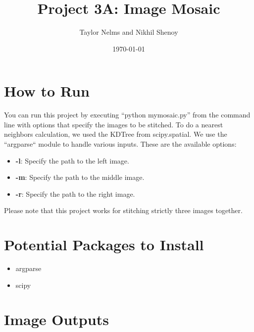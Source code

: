 \documentclass[10pt]{article}
\begin{document}
\title{\vspace{-2.0cm}Project 3A: Image Mosaic}
\author{Taylor Nelms and Nikhil Shenoy}
\date{\today}

\maketitle

\section{How to Run}
	You can run this project by executing ``python mymosaic.py'' from the command line with options that specify the images to be stitched. To do a nearest neighbors calculation, we used the KDTree from scipy.spatial. We use the ``argparse`` module to handle various inputs. These are the available options:

	\begin{itemize}
		\item \textbf{-l}: Specify the path to the left image.
		\item \textbf{-m}: Specify the path to the middle image.
		\item \textbf{-r}: Specify the path to the right image.
	\end{itemize}

	Please note that this project works for stitching strictly three images together.

\section{Potential Packages to Install}

	\begin{itemize}
		\item argparse
		\item scipy
	\end{itemize}

\section{Image Outputs}
\end{document}
